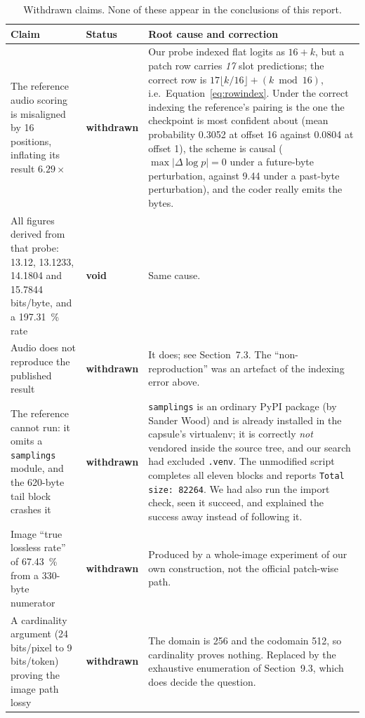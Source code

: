 \documentclass[11pt,a4paper]{article}
\newcommand{\code}[1]{\texttt{\small #1}}
\begin{document}
\begin{table}[htbp]
\centering
\small
\caption{Withdrawn claims. None of these appear in the conclusions of this report.}
\label{tab:retractions}
\begin{tabularx}{\textwidth}{L{4.1cm}L{1.6cm}X}
\toprule
Claim & Status & Root cause and correction \\
\midrule
The reference audio scoring is misaligned by 16 positions, inflating its result
$6.29\times$ & \textbf{withdrawn} & Our probe indexed flat logits as $16+k$, but a
  patch row carries \emph{17} slot predictions; the correct row is
  $17\lfloor k/16\rfloor + (k\bmod 16)$, i.e.\ Equation~\eqref{eq:rowindex}. Under
  the correct indexing the reference's pairing is the one the checkpoint is most
  confident about (mean probability \num{0.3052} at offset 16 against \num{0.0804}
  at offset 1), the scheme is causal ($\max|\Delta\log p| = 0$ under a
  future-byte perturbation, against \num{9.44} under a past-byte perturbation),
  and the coder really emits the bytes. \\
All figures derived from that probe: 13.12, 13.1233, 14.1804 and 15.7844
bits/byte, and a \SI{197.31}{\%} rate & \textbf{void} & Same cause. \\
Audio does not reproduce the published result & \textbf{withdrawn} & It does;
  see Section~7.3. The ``non-reproduction'' was an artefact of the indexing
  error above. \\
The reference cannot run: it omits a \code{samplings} module, and the 620-byte
tail block crashes it & \textbf{withdrawn} & \code{samplings} is an ordinary PyPI
  package (by Sander Wood) and is already installed in the capsule's virtualenv;
  it is correctly \emph{not} vendored inside the source tree, and our search had
  excluded \code{.venv}. The unmodified script completes all eleven blocks and
  reports \code{Total size: 82264}. We had also run the import check, seen it
  succeed, and explained the success away instead of following it. \\
Image ``true lossless rate'' of \SI{67.43}{\%} from a 330-byte numerator &
  \textbf{withdrawn} & Produced by a whole-image experiment of our own
  construction, not the official patch-wise path. \\
A cardinality argument (24 bits/pixel to 9 bits/token) proving the image path
lossy & \textbf{withdrawn} & The domain is 256 and the codomain 512, so
  cardinality proves nothing. Replaced by the exhaustive enumeration of
  Section~9.3, which does decide the question. \\

\end{tabularx}
\end{table}
\end{document}
